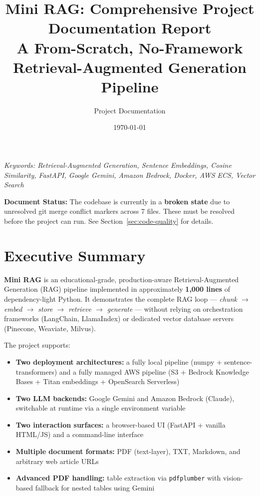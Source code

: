 \documentclass[11pt,a4paper]{paper}
\title{\textbf{Mini RAG: Comprehensive Project Documentation Report}\\[6pt]
\large A From-Scratch, No-Framework Retrieval-Augmented Generation Pipeline}
\author{Project Documentation}
\date{\today}
\begin{document}
\maketitle

\begin{center}
\textit{Keywords: Retrieval-Augmented Generation, Sentence Embeddings, Cosine Similarity, FastAPI, Google Gemini, Amazon Bedrock, Docker, AWS ECS, Vector Search}
\end{center}

\vspace{1em}

\textbf{\large Document Status:} The codebase is currently in a \textcolor{mergeconflict}{\textbf{broken state}} due to unresolved git merge conflict markers across 7 files. These must be resolved before the project can run. See Section~\ref{sec:code-quality} for details.

\newpage
\tableofcontents
\newpage

\section{Executive Summary}
\label{sec:exec-summary}

\textbf{Mini RAG} is an educational-grade, production-aware Retrieval-Augmented Generation (RAG) pipeline implemented in approximately \textbf{1,000 lines} of dependency-light Python. It demonstrates the complete RAG loop — \emph{chunk $\rightarrow$ embed $\rightarrow$ store $\rightarrow$ retrieve $\rightarrow$ generate} — without relying on orchestration frameworks (LangChain, LlamaIndex) or dedicated vector database servers (Pinecone, Weaviate, Milvus).

The project supports:

\begin{itemize}
  \item \textbf{Two deployment architectures:} a fully local pipeline (numpy + sentence-transformers) and a fully managed AWS pipeline (S3 + Bedrock Knowledge Bases + Titan embeddings + OpenSearch Serverless)
  \item \textbf{Two LLM backends:} Google Gemini and Amazon Bedrock (Claude), switchable at runtime via a single environment variable
  \item \textbf{Two interaction surfaces:} a browser-based UI (FastAPI + vanilla HTML/JS) and a command-line interface
  \item \textbf{Multiple document formats:} PDF (text-layer), TXT, Markdown, and arbitrary web article URLs
  \item \textbf{Advanced PDF handling:} table extraction via \texttt{pdfplumber} with vision-based fallback for nested tables using Gemini
\end{itemize}
\end{document}
